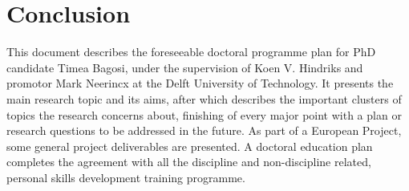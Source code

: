 \chapter{Conclusion}
This document describes the foreseeable doctoral programme plan for PhD
candidate Timea Bagosi, under the supervision of Koen V. Hindriks and
promotor Mark Neerincx at the Delft University of Technology. It presents
the main research topic and its aims, after which describes the important
clusters of topics the research concerns about, finishing of every major point
with a plan or research questions to be addressed in the future. As part
of a European Project, some general project deliverables are presented. A
doctoral education plan completes the agreement with all the discipline and
non-discipline related, personal skills development training programme.
    
  
  